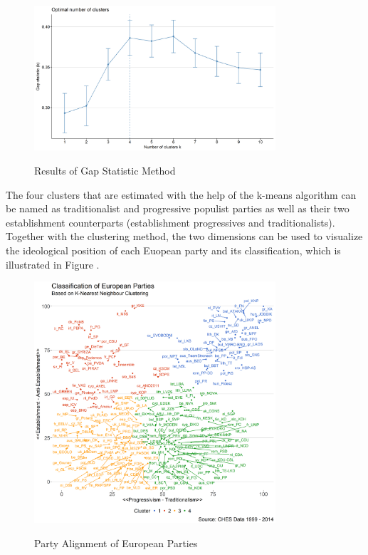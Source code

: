 \documentclass[]{article}
\begin{document}
\begin{figure}[!h]
    \centering
    \caption{Results of Gap Statistic Method}
    \includegraphics[width=0.8\textwidth]{images/optim_cluster}
    \label{fig:gap}
\end{figure}

The four clusters that are estimated with the help of the k-means
algorithm can be named as traditionalist and progressive populist
parties as well as their two establishment counterparts (establishment
progressives and traditionalists). Together with the clustering method,
the two dimensions can be used to visualize the ideological position of
each Euopean party and its classification, which is illustrated in
Figure \label{fig:alignment}.

\begin{figure}[!h]
    \centering
    \caption{Party Alignment of European Parties}
    \includegraphics[width=0.8\textwidth]{images/party_alignment_abstract}
    \label{fig:alignment}
\end{figure}
\end{document}
